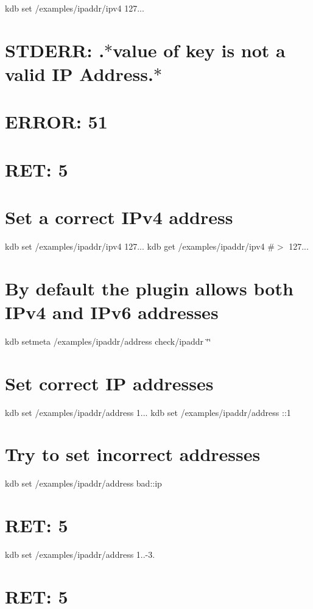 kdb set /examples/ipaddr/ipv4 127... \section*{S\+T\+D\+E\+RR\+: .$\ast$value of key is not a valid IP Address.$\ast$}

\section*{E\+R\+R\+OR\+: 51}

\section*{R\+ET\+: 5}

\section*{Set a correct I\+Pv4 address}

kdb set /examples/ipaddr/ipv4 127... kdb get /examples/ipaddr/ipv4 \#$>$ 127...

\section*{By default the plugin allows both I\+Pv4 and I\+Pv6 addresses}

kdb setmeta /examples/ipaddr/address check/ipaddr \char`\"{}\char`\"{}

\section*{Set correct IP addresses}

kdb set /examples/ipaddr/address 1... kdb set /examples/ipaddr/address \+:\+:1

\section*{Try to set incorrect addresses}

kdb set /examples/ipaddr/address bad\+::ip \section*{R\+ET\+: 5}

kdb set /examples/ipaddr/address 1..-\/3. \section*{R\+ET\+: 5}

